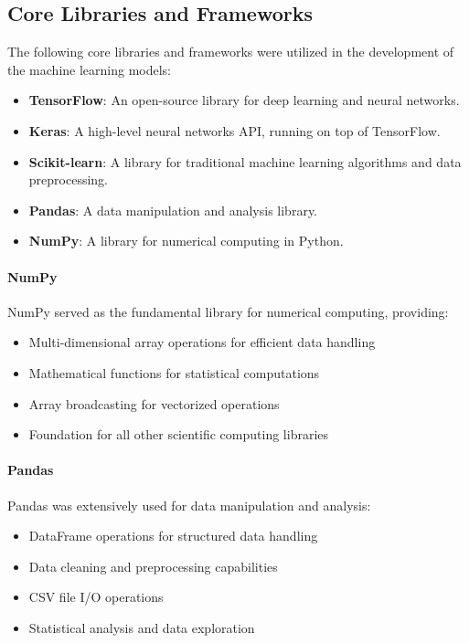 \documentclass[12pt, a4paper]{article}
\begin{document}
\subsection{Core Libraries and Frameworks}
The following core libraries and frameworks were utilized in the development of the machine learning models:
\begin{itemize}
    \item \textbf{TensorFlow}: An open-source library for deep learning and neural networks.
    \item \textbf{Keras}: A high-level neural networks API, running on top of TensorFlow.
    \item \textbf{Scikit-learn}: A library for traditional machine learning algorithms and data preprocessing.
    \item \textbf{Pandas}: A data manipulation and analysis library.
    \item \textbf{NumPy}: A library for numerical computing in Python.
\end{itemize}

\paragraph{NumPy}
NumPy served as the fundamental library for numerical computing, providing:
\begin{itemize}
    \item Multi-dimensional array operations for efficient data handling
    \item Mathematical functions for statistical computations
    \item Array broadcasting for vectorized operations
    \item Foundation for all other scientific computing libraries
\end{itemize}

\paragraph{Pandas}
Pandas was extensively used for data manipulation and analysis:
\begin{itemize}
    \item DataFrame operations for structured data handling
    \item Data cleaning and preprocessing capabilities
    \item CSV file I/O operations
    \item Statistical analysis and data exploration
\end{itemize}
\end{document}

